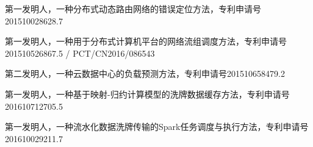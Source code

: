 \begin{patents}{99}
    \item 第一发明人，一种分布式动态路由网络的错误定位方法，专利申请号201510028628.7
    \item 第一发明人，一种用于分布式计算机平台的网络流组调度方法，专利申请号201510526867.5 / PCT/CN2016/086543
    \item 第二发明人，一种云数据中心的负载预测方法，专利申请号201510658479.2
    \item 第一发明人，一种基于映射-归约计算模型的洗牌数据缓存方法，专利申请号201610712705.5
    \item 第一发明人，一种流水化数据洗牌传输的Spark任务调度与执行方法，专利申请号201610029211.7
\end{patents}
